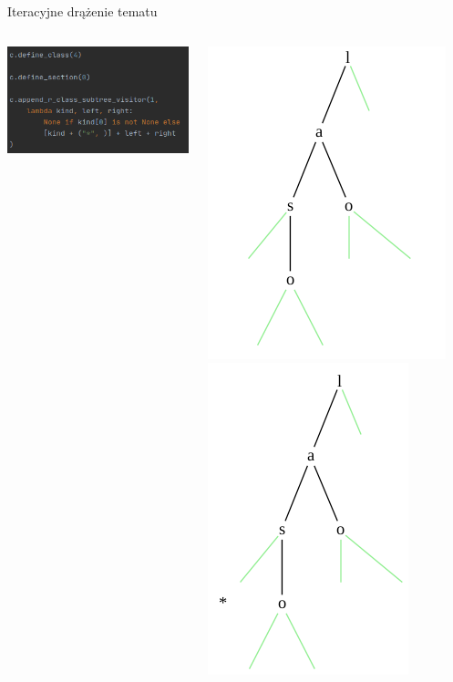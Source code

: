 \documentclass[final]{beamer}
\theoremstyle{bluetheorem}
\theoremstyle{bluetheorem}
\theoremstyle{greentheorem}
\begin{document}
\begin{frame}{Iteracyjne drążenie tematu}
    \begin{columns}
        \begin{block}{}
            \begin{center}
                \includegraphics[width=.8\textwidth]{framework_002.png}
            \end{center}
        \end{block}

        \begin{block}{}
            \begin{center}
                \includegraphics[height=.6\textwidth]{example.png}
                \raisebox{.3\textwidth}{$\rightarrow$}
                \includegraphics[height=.6\textwidth]{example_002.png}


\end{center}
\end{block}
\end{columns}
\end{frame}
\end{document}
